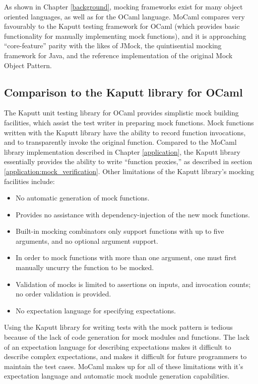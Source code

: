 As shown in Chapter \ref{background}, mocking frameworks exist for
many object oriented languages, as well as for the OCaml
language. MoCaml compares very favourably to the Kaputt testing
framework for OCaml (which provides basic functionality for manually
implementing mock functions), and it is approaching ``core-feature''
parity with the likes of JMock, the quintisential mocking framework
for Java, and the reference implementation of the original Mock Object
Pattern.

\subsection{Comparison to the Kaputt library for OCaml}

The Kaputt unit testing library for OCaml provides simplistic mock
building facilities, which assist the test writer in preparing mock
functions. Mock functions written with the Kaputt library have the
ability to record function invocations, and to transparently invoke
the original function. Compared to the MoCaml library implementation
described in Chapter \ref{application}, the Kaputt library essentially
provides the ability to write ``function proxies,'' as described in
section \ref{application:mock_verification}. Other limitations of the
Kaputt library's mocking facilities include:

\begin{itemize}
\item No automatic generation of mock functions.
\item Provides no assistance with dependency-injection of the new mock
  functions.
\item Built-in mocking combinators only support functions with up to
  five arguments, and no optional argument support.
\item In order to mock functions with more than one argument, one must
  first manually uncurry the function to be mocked.
\item Validation of mocks is limited to assertions on inputs, and
  invocation counts; no order validation is provided.
\item No expectation language for specifying expectations.
\end{itemize}

Using the Kaputt library for writing tests with the mock pattern is
tedious because of the lack of code generation for mock modules and
functions. The lack of an expectation language for describing
expectations makes it difficult to describe complex expectations, and
makes it difficult for future programmers to maintain the test
cases. MoCaml makes up for all of these limitations with it's
expectation language and automatic mock module generation
capabilities.

